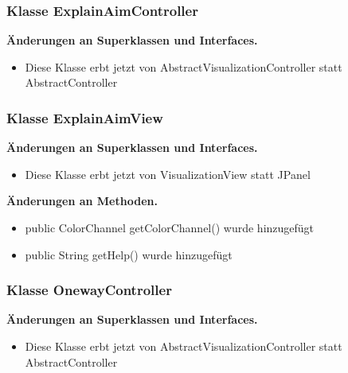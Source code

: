 \documentclass{article}
\begin{document}
	\subsubsection{Klasse ExplainAimController}
	    \textbf{Änderungen an Superklassen und Interfaces.}\newline
	   \begin{itemize}
            \item Diese Klasse erbt jetzt von AbstractVisualizationController statt AbstractController\newline
           \end{itemize}

	\subsubsection{Klasse ExplainAimView}
	    \textbf{Änderungen an Superklassen und Interfaces.}\newline
	   \begin{itemize}
            \item Diese Klasse erbt jetzt von VisualizationView statt JPanel\newline
           \end{itemize}
    \textbf{Änderungen an Methoden.}\newline
	   \begin{itemize}
           \item public ColorChannel getColorChannel() wurde hinzugefügt\newline
           \item public String getHelp() wurde hinzugefügt\newline
           \end{itemize}

	\subsubsection{Klasse OnewayController}
	    \textbf{Änderungen an Superklassen und Interfaces.}\newline
	   \begin{itemize}
            \item Diese Klasse erbt jetzt von AbstractVisualizationController statt AbstractController\newline
           \end{itemize}
\end{document}

